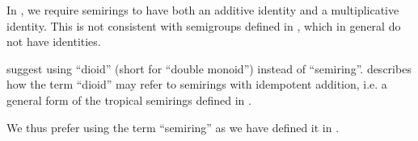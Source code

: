 \begin{remark}\label{rem:semiring_etymology}
  In , we require semirings to have both an additive identity and a multiplicative identity. This is not consistent with semigroups defined in , which in general do not have identities.

  \cite[ch. 3]{GondranMinoux1984Graphs} suggest using \enquote{dioid} (short for \enquote{double monoid}) instead of \enquote{semiring}. \cite[xi]{Golan2010} describes how the term \enquote{dioid} may refer to semirings with idempotent addition, i.e. a general form of the tropical semirings defined in .

  We thus prefer using the term \enquote{semiring} as we have defined it in .
\end{remark}

